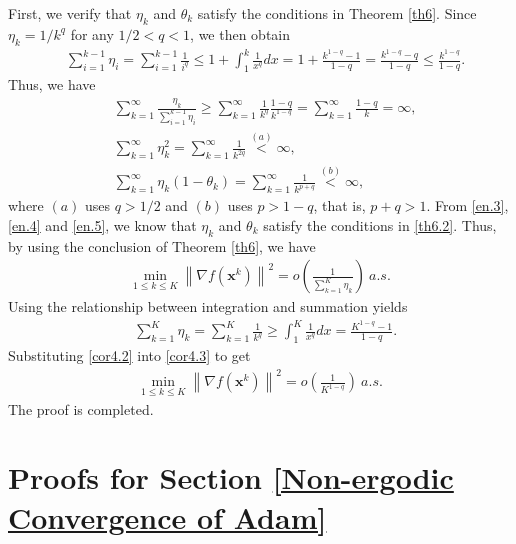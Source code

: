 \documentclass[twoside,11pt]{article}
\begin{document}
First, we verify that $\eta_{k}$ and $\theta_{k}$ satisfy the conditions in Theorem \ref{th6}. Since $\eta_{k}=1/k^{q}$ for any $1/2<q<1$, we then obtain
\begin{equation}
   	\begin{aligned}
     	\label{cor4.1}&\sum _{i=1}^{k-1}\eta _{i}= \sum _{i=1}^{k-1}\frac{1}{i^{q}}\leq 1 + \int _{1}^{k}\frac{1}{x^{q}}dx= 1 + \frac{k^{1-q}-1}{1-q}=\frac{k^{1-q}-q}{1-q}\leq \frac{k^{1-q}}{1-q}.\nonumber
   	\end{aligned}
\end{equation}
Thus, we have 
\begin{align}
   		\label{en.3}&\sum_{k=1}^{\infty}\frac{\eta_k}{\sum_{i=1}^{k-1}\eta_i}
   		\ge\sum_{k=1}^{\infty}\frac{1}{k^q}\frac{1-q}{k^{1-q}}
   		=\sum_{k=1}^{\infty}\frac{1-q}{k}
   		=\infty,\\
   		\label{en.4}&\sum_{k=1}^{\infty}\eta_{k}^2
   		=\sum_{k=1}^{\infty}\frac{1}{k^{2q}}
   		\overset{(a)}{<}\infty,\\
   		\label{en.5}&\sum_{k=1}^{\infty}\eta_{k}(1-\theta_k)
   		=\sum_{k=1}^{\infty}\frac{1}{k^{p+q}}
   		\overset{(b)}{<}\infty,
\end{align}
where $(a)$ uses $q>1/2$ and $(b)$ uses $p>1-q$,  that is,  $p+q>1$. From \eqref{en.3}, \eqref{en.4} and  \eqref{en.5}, we know that $\eta_{k}$ and $\theta_k$ satisfy the conditions in \eqref{th6.2}. Thus, by using the conclusion of Theorem \ref{th6}, we have
\begin{align}\label{cor4.3}
   	\min_{1\le k\le K}\left\| \nabla f(\mathbf{x}^k)\right\|^2=o\left( \frac{1}{\sum_{k=1}^{K}\eta_{k}}\right)\ a.s. 
\end{align}
Using the relationship between integration and summation yields
\begin{align}\label{cor4.2}
   	&\sum _{k=1}^{K}\eta _{k}
   	= \sum _{k=1}^{K}\frac{1}{k^{q}}\geq \int _{1}^{K}\frac{1}{x^{q}}dx= \frac{K^{1-q}-1}{1-q}.
\end{align}
Substituting \eqref{cor4.2} into \eqref{cor4.3} to get
\begin{equation}
   		\begin{aligned}
   		\min_{1\le k\le K}\left\| \nabla f(\mathbf{x}^k)\right\|^2
   		=o\left( \frac{1}{K^{1-q}}\right)  \ a.s. \nonumber
   		\end{aligned}
\end{equation}
The proof is completed.

 
\section{Proofs for Section \ref{Non-ergodic Convergence of Adam}}
\end{document}
